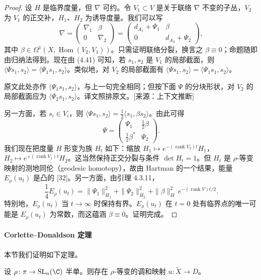 \begin{proof}
设 $H$ 是临界度量，但 $\nabla$ 可约。令 $V_1\subset V$ 是关于联络 $\nabla$ 不变的子丛，$V_2$ 为 $V_1$ 的正交补，$H_1$、$H_2$ 为诱导度量。我们可以写
\[
\nabla=\begin{pmatrix}\nabla_1&\beta\\0&\nabla_2\end{pmatrix}=\begin{pmatrix}d_{A_1}+\Psi_1&\beta\\0&d_{A_2}+\Psi_2\end{pmatrix},
\]
其中 $\beta\in\Omega^1(X,\operatorname{Hom}(V_2,V_1))$。只需证明联络分裂，换言之 $\beta\equiv0$；命题随即由归纳法得到。现在由 (4.41) 可知，若 $s_1,s_2$ 是 $V_1$ 的局部截面，则 $\langle\Psi s_1,s_2\rangle=\langle\Psi_1s_1,s_2\rangle$。类似地，对 $V_2$ 的局部截面有 $\langle\Psi s_1,s_2\rangle=\langle\Psi_1s_1,s_2\rangle$。\begin{annote}原文此处亦作 $\langle\Psi_1s_1,s_2\rangle$，与上一句完全相同；但按下面 $\Psi$ 的分块形状，对 $V_2$ 的局部截面应为 $\langle\Psi_2s_1,s_2\rangle$。译文照排原文。[来源：上下文推断]\end{annote}另一方面，若 $s_i\in V_i$，则 $\langle\Psi s_1,s_2\rangle=\frac{1}{2}\langle s_1,\beta s_2\rangle$。由此可得
\[
\Psi=\begin{pmatrix}\Psi_1&\frac{1}{2}\beta\\[2pt]\frac{1}{2}\beta^*&\Psi_2\end{pmatrix}.
\]
我们现在把度量 $H$ 形变为族 $H_t$ 如下：缩放 $H_1\mapsto e^{-(\operatorname{rank}V_2)t}H_1$，$H_2\mapsto e^{+(\operatorname{rank}V_1)t}H_2$。这当然保持正交分裂与条件 $\det H_t=1$。但 $H_t$ 是 $\rho$-等变映射的测地同伦（geodesic homotopy），故由 Hartman 的一个结果，能量 $E_\rho(u_t)$ 是凸的 [32]。另一方面，由引理 4.3.11，
\[
\frac{1}{4}E_\rho(u_t)=\|\Psi_1\|^2_{H_1}+\|\Psi_2\|^2_{H_2}+\|\beta\|^2_H\,e^{-(\operatorname{rank}V)t/2}.
\]
特别地，$E_\rho(u_t)$ 当 $t\to\infty$ 时保持有界。$E_\rho(u_t)$ 在 $t=0$ 处有临界点的唯一可能是 $E_\rho(u_t)$ 为常数，而这蕴涵 $\beta\equiv0$。证明完成。
\end{proof}

\paragraph{Corlette--Donaldson 定理} 本节我们证明如下定理。

\begin{theorem}
设 $\rho\colon\pi\to\operatorname{SL}_n(\C)$ 半单。则存在 $\rho$-等变的调和映射 $u\colon\widetilde X\to D$。
\end{theorem}

